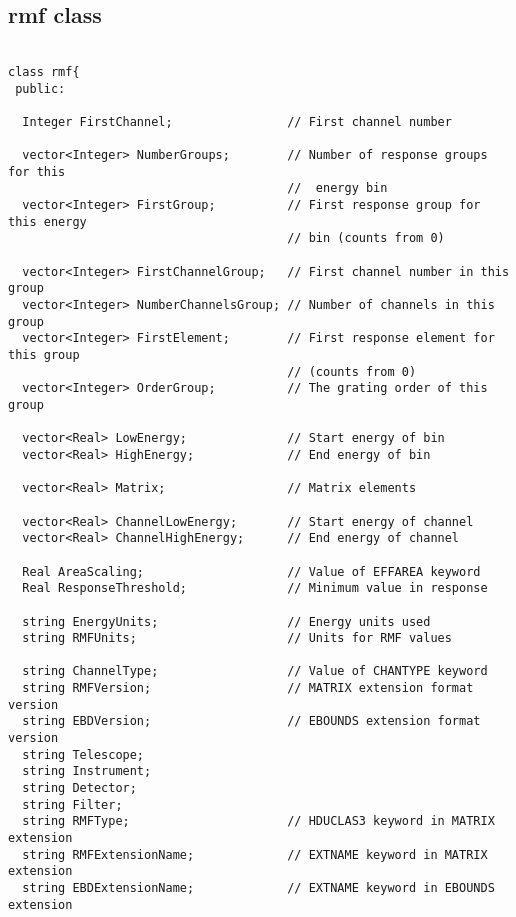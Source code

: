 \documentclass[11pt]{book}
\begin{document}
\subsection{rmf class}

\begin{verbatim}

class rmf{
 public:

  Integer FirstChannel;                // First channel number 

  vector<Integer> NumberGroups;        // Number of response groups for this
                                       //  energy bin 
  vector<Integer> FirstGroup;          // First response group for this energy
                                       // bin (counts from 0)

  vector<Integer> FirstChannelGroup;   // First channel number in this group 
  vector<Integer> NumberChannelsGroup; // Number of channels in this group 
  vector<Integer> FirstElement;        // First response element for this group
                                       // (counts from 0)
  vector<Integer> OrderGroup;          // The grating order of this group 

  vector<Real> LowEnergy;              // Start energy of bin 
  vector<Real> HighEnergy;             // End energy of bin 

  vector<Real> Matrix;                 // Matrix elements 

  vector<Real> ChannelLowEnergy;       // Start energy of channel 
  vector<Real> ChannelHighEnergy;      // End energy of channel 

  Real AreaScaling;                    // Value of EFFAREA keyword 
  Real ResponseThreshold;              // Minimum value in response 

  string EnergyUnits;                  // Energy units used
  string RMFUnits;                     // Units for RMF values

  string ChannelType;                  // Value of CHANTYPE keyword 
  string RMFVersion;                   // MATRIX extension format version 
  string EBDVersion;                   // EBOUNDS extension format version 
  string Telescope;                             
  string Instrument;
  string Detector;
  string Filter;
  string RMFType;                      // HDUCLAS3 keyword in MATRIX extension 
  string RMFExtensionName;             // EXTNAME keyword in MATRIX extension 
  string EBDExtensionName;             // EXTNAME keyword in EBOUNDS extension 

\end{verbatim}
\end{document}
